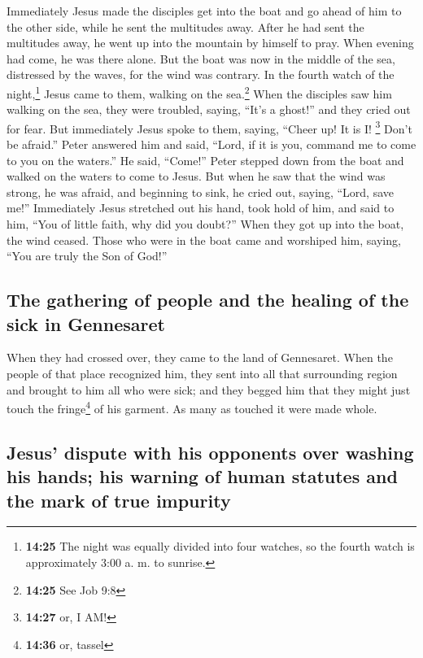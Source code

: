  Immediately Jesus made the disciples get into the boat
and go ahead of him to the other side, while he sent the multitudes
away.  After he had sent the multitudes away, he went up
into the mountain by himself to pray. When evening had come, he was
there alone.  But the boat was now in the middle of the
sea, distressed by the waves, for the wind was contrary. 
In the fourth watch of the night,\footnote{\textbf{14:25} The night was
  equally divided into four watches, so the fourth watch is
  approximately 3:00 a. m. to sunrise.} Jesus came to them, walking on
the sea.\footnote{\textbf{14:25} See Job 9:8}  When the
disciples saw him walking on the sea, they were troubled, saying, ``It's
a ghost!'' and they cried out for fear.  But immediately
Jesus spoke to them, saying, ``Cheer up! It is I! \footnote{\textbf{14:27}
  or, I AM!} Don't be afraid.''  Peter answered him and
said, ``Lord, if it is you, command me to come to you on the waters.''
 He said, ``Come!'' Peter stepped down from the boat and
walked on the waters to come to Jesus.  But when he saw
that the wind was strong, he was afraid, and beginning to sink, he cried
out, saying, ``Lord, save me!''  Immediately Jesus
stretched out his hand, took hold of him, and said to him, ``You of
little faith, why did you doubt?''  When they got up into
the boat, the wind ceased.  Those who were in the boat
came and worshiped him, saying, ``You are truly the Son of God!''

\hypertarget{the-gathering-of-people-and-the-healing-of-the-sick-in-gennesaret}{%
\subsection{The gathering of people and the healing of the sick in
Gennesaret}\label{the-gathering-of-people-and-the-healing-of-the-sick-in-gennesaret}}

 When they had crossed over, they came to the land of
Gennesaret.  When the people of that place recognized
him, they sent into all that surrounding region and brought to him all
who were sick;  and they begged him that they might just
touch the fringe\footnote{\textbf{14:36} or, tassel} of his garment. As
many as touched it were made whole.

\hypertarget{jesus-dispute-with-his-opponents-over-washing-his-hands-his-warning-of-human-statutes-and-the-mark-of-true-impurity}{%
\subsection{Jesus' dispute with his opponents over washing his hands;
his warning of human statutes and the mark of true
impurity}\label{jesus-dispute-with-his-opponents-over-washing-his-hands-his-warning-of-human-statutes-and-the-mark-of-true-impurity}}

